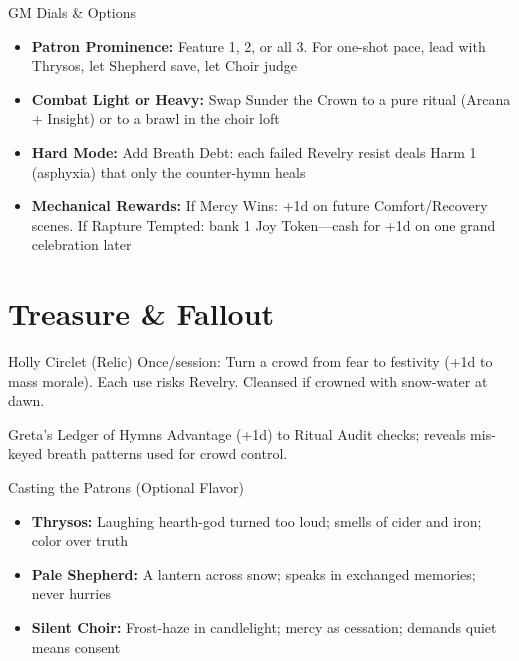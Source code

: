 \documentclass[11pt]{article}
\begin{document}
\begin{mechanicsbox}{GM Dials \& Options}
\begin{itemize}
    \item \textbf{Patron Prominence:} Feature 1, 2, or all 3. For one-shot pace, lead with Thrysos, let Shepherd save, let Choir judge
    \item \textbf{Combat Light or Heavy:} Swap Sunder the Crown to a pure ritual (Arcana + Insight) or to a brawl in the choir loft
    \item \textbf{Hard Mode:} Add Breath Debt: each failed Revelry resist deals Harm 1 (asphyxia) that only the counter-hymn heals
    \item \textbf{Mechanical Rewards:} If Mercy Wins: +1d on future Comfort/Recovery scenes. If Rapture Tempted: bank 1 Joy Token---cash for +1d on one grand celebration later
\end{itemize}
\end{mechanicsbox}

\section*{Treasure \& Fallout}

\begin{mechanicsbox}{Holly Circlet (Relic)}
Once/session: Turn a crowd from fear to festivity (+1d to mass morale). Each use risks Revelry. Cleansed if crowned with snow-water at dawn.
\end{mechanicsbox}

\begin{mechanicsbox}{Greta's Ledger of Hymns}
Advantage (+1d) to Ritual Audit checks; reveals mis-keyed breath patterns used for crowd control.
\end{mechanicsbox}

\begin{mechanicsbox}{Casting the Patrons (Optional Flavor)}
\begin{itemize}
    \item \textbf{Thrysos:} Laughing hearth-god turned too loud; smells of cider and iron; color over truth
    \item \textbf{Pale Shepherd:} A lantern across snow; speaks in exchanged memories; never hurries
    \item \textbf{Silent Choir:} Frost-haze in candlelight; mercy as cessation; demands quiet means consent
\end{itemize}
\end{mechanicsbox}
\end{document}
